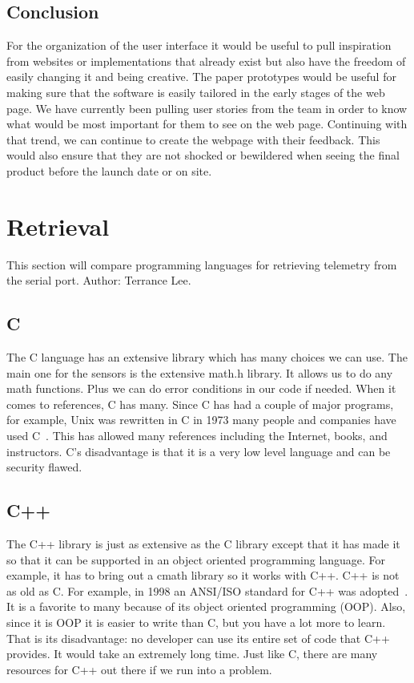 \documentclass[10pt,draftclsnofoot,onecolumn]{IEEEtran}
\begin{document}
	\subsection{Conclusion}
	For the organization of the user interface it would be useful to pull inspiration from websites or implementations
	that already exist but also have the freedom of easily changing it and being creative. 
	The paper prototypes would be useful for making sure that the software is easily tailored in the early stages of the 
	web page. 
	We have currently been pulling user stories from the team in order to know what would be most important for them to 
	see on the web page. 
	Continuing with that trend, we can continue to create the webpage with their feedback. 
	This would also ensure that they are not shocked or bewildered when seeing the final product before the launch date
	or on site.
	
	\section{Retrieval}
	This section will compare programming languages for retrieving telemetry from the serial port. Author: Terrance Lee.
   	\subsection{C}
   	The C language has an extensive library which has many choices we can use. 
	The main one for the sensors is the extensive math.h library. 
	It allows us to do any math functions. Plus we can do error conditions in our code if needed. 
	When it comes to references, C has many. 
	Since C has had a couple of major programs, for example, Unix was rewritten in C in 1973 many people and companies have
	used C~\cite{history-of-unix-part-i}.
	This has allowed many references including the Internet, books, and instructors. C's disadvantage is that it is a very low level language and can be security flawed.

	\subsection{C++}
   	The C++ library is just as extensive as the C library except that it has made it so that it can be supported in an
	object oriented programming language. 
	For example, it has to bring out a cmath library so it works with C++.
	C++ is not as old as C. For example, in 1998 an ANSI/ISO standard for C++ was adopted~\cite{c-programmers-reference}.
	It is a favorite to many because of its object oriented programming (OOP). 
	Also, since it is OOP it is easier to write than C, but you have a lot more to learn. 
	That is its disadvantage: no developer can use its entire set of code that C++ provides.
	It would take an extremely long time. Just like C, there are many resources for C++ out there if we run into a problem.
\end{document}
